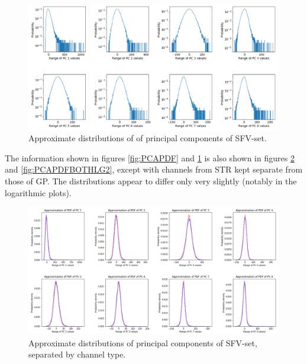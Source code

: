\documentclass{kththesis}
\begin{document}
\begin{figure}[H]
    \centering
    \centerline{\includegraphics[width=1.2\textwidth]{images/PCA/PCAPDFLG2.png}}
    \caption{Approximate distributions of of principal components of SFV-set.}
    \label{fig:PCAPDFLG2}
\end{figure}

The information shown in figures \ref{fig:PCAPDF} and \ref{fig:PCAPDFLG2} is also shown in figures \ref{fig:PCAPDFBOTH} and \ref{fig:PCAPDFBOTHLG2}, except with channels from STR kept separate from those of GP.
The distributions appear to differ only very slightly (notably in the logarithmic plots). 

\begin{figure}[H]
    \centering
    \centerline{\includegraphics[width=1.2\textwidth]{images/PCA/PCABOTH.png}}
    \caption{Approximate distributions of principal components of SFV-set, separated by channel type.}
    \label{fig:PCAPDFBOTH}
\end{figure}
\end{document}
